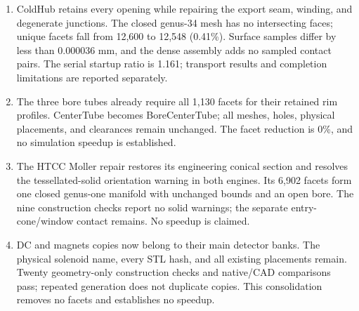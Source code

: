 \begin{enumerate}
\item ColdHub retains every opening while repairing the export seam, winding, and degenerate junctions. The closed
genus-34 mesh has no intersecting faces; unique facets fall from 12,600 to 12,548 (0.41\%). Surface samples
differ by less than 0.000036 mm, and the dense assembly adds no sampled contact pairs. The serial startup
ratio is 1.161; transport results and completion limitations are reported separately.

\item The three bore tubes already require all 1,130 facets for their retained rim profiles. CenterTube becomes
BoreCenterTube; all meshes, holes, physical placements, and clearances remain unchanged. The facet reduction
is 0\%, and no simulation speedup is established.

\item The HTCC Moller repair restores its engineering conical section and resolves the tessellated-solid orientation
warning in both engines. Its 6,902 facets form one closed genus-one manifold with unchanged bounds and an open
bore. The nine construction checks report no solid warnings; the separate entry-cone/window contact remains.
No speedup is claimed.

\item DC and magnets copies now belong to their main detector banks. The physical solenoid name, every STL hash, and
all existing placements remain. Twenty geometry-only construction checks and native/CAD comparisons pass;
repeated generation does not duplicate copies. This consolidation removes no facets and establishes no
speedup.

\end{enumerate}
